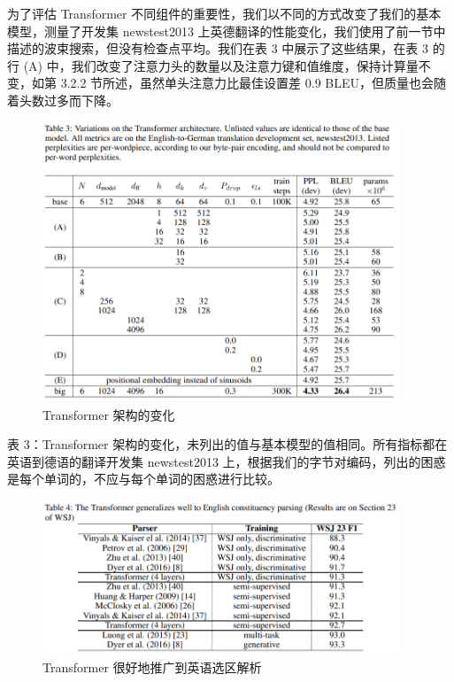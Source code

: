 为了评估 Transformer 不同组件的重要性，我们以不同的方式改变了我们的基本模型，测量了开发集 newstest2013 上英德翻译的性能变化，我们使用了前一节中描述的波束搜索，但没有检查点平均。我们在表 3 中展示了这些结果，在表 3 的行 (A) 中，我们改变了注意力头的数量以及注意力键和值维度，保持计算量不变，如第 3.2.2 节所述，虽然单头注意力比最佳设置差 0.9 BLEU，但质量也会随着头数过多而下降。

\begin{figure}[htb]
\centering 
\includegraphics[width=0.95\textwidth]{img/t3.png} 
\caption{Transformer 架构的变化}
\label{Test}
\end{figure}

表 3：Transformer 架构的变化，未列出的值与基本模型的值相同。所有指标都在英语到德语的翻译开发集 newstest2013 上，根据我们的字节对编码，列出的困惑是每个单词的，不应与每个单词的困惑进行比较。

\begin{figure}[htb]
\centering 
\includegraphics[width=0.95\textwidth]{img/t4.png} 
\caption{Transformer 很好地推广到英语选区解析}
\label{Test}
\end{figure}

